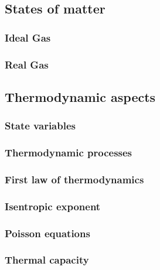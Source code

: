 \documentclass{subfiles}
\begin{document}
    \subsection{States of matter}
    
        \subsubsection*{Ideal Gas}

        \subsubsection*{Real Gas}
    
    \subsection{Thermodynamic aspects}
    
        \subsubsection*{State variables}
        
        \subsubsection*{Thermodynamic processes}
        
        \subsubsection*{First law of thermodynamics}
        
        \subsubsection*{Isentropic exponent}
        
        \subsubsection*{Poisson equations}
        
        \subsubsection*{Thermal capacity}


\end{document}
